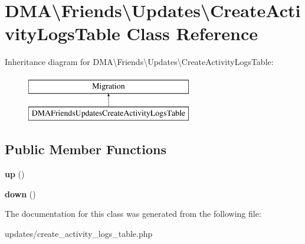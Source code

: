 \hypertarget{classDMA_1_1Friends_1_1Updates_1_1CreateActivityLogsTable}{\section{D\-M\-A\textbackslash{}Friends\textbackslash{}Updates\textbackslash{}Create\-Activity\-Logs\-Table Class Reference}
\label{classDMA_1_1Friends_1_1Updates_1_1CreateActivityLogsTable}
}
Inheritance diagram for D\-M\-A\textbackslash{}Friends\textbackslash{}Updates\textbackslash{}Create\-Activity\-Logs\-Table\-:\begin{figure}[H]
\begin{center}
\leavevmode
\includegraphics[height=2.000000cm]{d4/d43/classDMA_1_1Friends_1_1Updates_1_1CreateActivityLogsTable}
\end{center}
\end{figure}
\subsection*{Public Member Functions}
\begin{DoxyCompactItemize}
\item 
\hypertarget{classDMA_1_1Friends_1_1Updates_1_1CreateActivityLogsTable_a3c59c45baf4811431daa5f05444a8afd}{{\bfseries up} ()}\label{classDMA_1_1Friends_1_1Updates_1_1CreateActivityLogsTable_a3c59c45baf4811431daa5f05444a8afd}

\item 
\hypertarget{classDMA_1_1Friends_1_1Updates_1_1CreateActivityLogsTable_ad9027e6b0331d4ab7a7c2dc0a6080c9c}{{\bfseries down} ()}\label{classDMA_1_1Friends_1_1Updates_1_1CreateActivityLogsTable_ad9027e6b0331d4ab7a7c2dc0a6080c9c}

\end{DoxyCompactItemize}


The documentation for this class was generated from the following file\-:\begin{DoxyCompactItemize}
\item 
updates/create\-\_\-activity\-\_\-logs\-\_\-table.\-php\end{DoxyCompactItemize}
